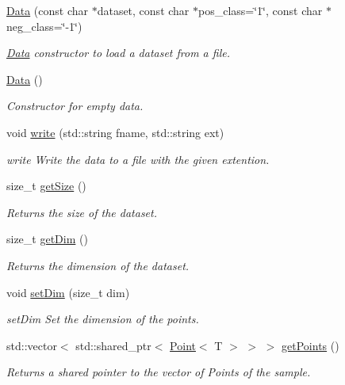 \begin{DoxyCompactItemize}
\item 
\hyperlink{class_data_a3c777650cc0c7123906cd5ff373d3fd6}{Data} (const char $\ast$dataset, const char $\ast$pos\+\_\+class=\char`\"{}1\char`\"{}, const char $\ast$neg\+\_\+class=\char`\"{}-\/1\char`\"{})
\begin{DoxyCompactList}\small\item\em \hyperlink{class_data}{Data} constructor to load a dataset from a file. \end{DoxyCompactList}\item 
\hyperlink{class_data_ab37beb31b788e0c806211af241b86bba}{Data} ()
\begin{DoxyCompactList}\small\item\em Constructor for empty data. \end{DoxyCompactList}\item 
void \hyperlink{class_data_a1f0bf8cc73e43cd6915289706abc46b2}{write} (std\+::string fname, std\+::string ext)
\begin{DoxyCompactList}\small\item\em write Write the data to a file with the given extention. \end{DoxyCompactList}\item 
size\+\_\+t \hyperlink{class_data_a310d4da4294cb3576a2faf0809c91b1e}{get\+Size} ()
\begin{DoxyCompactList}\small\item\em Returns the size of the dataset. \end{DoxyCompactList}\item 
size\+\_\+t \hyperlink{class_data_a87bdacb790f5a21966308c82b8be44d0}{get\+Dim} ()
\begin{DoxyCompactList}\small\item\em Returns the dimension of the dataset. \end{DoxyCompactList}\item 
void \hyperlink{class_data_ad6e602802e593e4700b3746de55f890b}{set\+Dim} (size\+\_\+t dim)
\begin{DoxyCompactList}\small\item\em set\+Dim Set the dimension of the points. \end{DoxyCompactList}\item 
std\+::vector$<$ std\+::shared\+\_\+ptr$<$ \hyperlink{class_point}{Point}$<$ T $>$ $>$ $>$ \hyperlink{class_data_a63a36fcbe42e0956d602f11af0d2009e}{get\+Points} ()
\begin{DoxyCompactList}\small\item\em Returns a shared pointer to the vector of Points of the sample. \end{DoxyCompactList}\item 

\end{DoxyCompactItemize}
